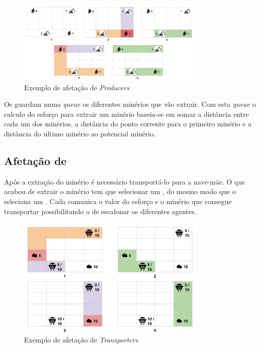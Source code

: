 \documentclass[12pt]{report}
\begin{document}
\begin{figure}[h]
  \centering
    \includegraphics[width=0.8\textwidth]{producer-scheduling}
  \caption{\small{Exemplo de afetação de \textit{Producers}}}
\end{figure}

Os \producers guardam numa \emph{queue} os diferentes minérios que vão extrair. Com esta \emph{queue} o calculo do esforço
para extrair um minério baseia-se em somar a distância entre cada um dos minérios, a distância do ponto corrente para o primeiro
minério e a distância do ultimo minério ao potencial minério.

\FloatBarrier
\newpage
\subsection{Afetação de \transporters}
Após a extração do minério é necessário transportá-lo para a nave-mãe. O \producer que acabou de extrair o minério tem que selecionar 
um \transporter, do mesmo modo que o \spotter seleciona um \producer. Cada \transporter comunica o valor
do esforço e o minério que consegue transportar possibilitando o \producer de escalonar os diferentes agentes.

\begin{figure}[h]
  \centering
    \includegraphics[width=0.8\textwidth]{transporter-scheduling}
  \caption{\small{Exemplo de afetação de \textit{Transporters}}}
\end{figure}
\end{document}
